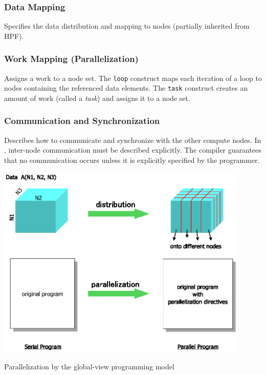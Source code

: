 
\subsubsection*{Data Mapping}
Specifies the data distribution and mapping to nodes (partially
inherited from HPF).

\subsubsection*{Work Mapping (Parallelization)}
Assigns a work to a node set. The {\tt loop} construct maps each iteration of
a loop to nodes containing the referenced data elements. The {\tt task}
construct creates an amount of work (called a {\it task}) and assigns it
to a node set.

\subsubsection*{Communication and Synchronization}
Describes how to communicate and synchronize with the other compute
nodes. In {\XMP}, inter-node communication must be described
explicitly. The compiler guarantees that no communication occurs
unless it is explicitly specified by the programmer.

\begin{myfigure}
\includegraphics[width=12cm]{figs/Fig2.eps}
  \caption{Parallelization by the global-view programming model}
\label{fig2}
\end{myfigure}

